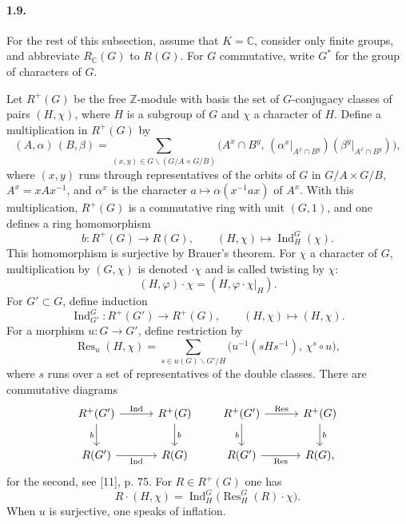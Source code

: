\documentclass[10pt]{article}
\newcommand{\C}{\mathbb C}
\newcommand{\Z}{\mathbb Z}
\newcommand{\Ind}{\operatorname{Ind}}
\newcommand{\Res}{\operatorname{Res}}
\providecommand{\Ind}{\operatorname{Ind}}
\begin{document}
\paragraph{1.9.} For the rest of this subsection, assume that \(K=\C\), consider only finite groups, and abbreviate \(R_\C(G)\) to \(R(G)\). For \(G\) commutative, write \(G^*\) for the group of characters of \(G\).

Let \(R^+(G)\) be the free \(\Z\)-module with basis the set of \(G\)-conjugacy classes of pairs \((H,\chi)\), where \(H\) is a subgroup of \(G\) and \(\chi\) a character of \(H\). Define a multiplication in \(R^+(G)\) by
\[
\tag{1.9.1}
(A,\alpha)\,(B,\beta)=
\sum_{(x,y)\in G\backslash(G/A\times G/B)}
\bigl(A^x\cap B^y,\,
(\alpha^x|_{A^x\cap B^y})(\beta^y|_{A^x\cap B^y})\bigr),
\]
where \((x,y)\) runs through representatives of the orbits of \(G\) in \(G/A\times G/B\), \(A^x=xAx^{-1}\), and \(\alpha^x\) is the character \(a\mapsto \alpha(x^{-1}ax)\) of \(A^x\). With this multiplication, \(R^+(G)\) is a commutative ring with unit \((G,1)\), and one defines a ring homomorphism
\[
\tag{1.9.2}
b:R^+(G)\longrightarrow R(G),\qquad (H,\chi)\longmapsto \Ind_H^G(\chi).
\]
This homomorphism is surjective by Brauer's theorem. For \(\chi\) a character of \(G\), multiplication by \((G,\chi)\) is denoted \(\cdot\chi\) and is called twisting by \(\chi\):
\[
\tag{1.9.3}
(H,\varphi)\cdot\chi=(H,\varphi\cdot\chi|_H).
\]
For \(G'\subset G\), define induction
\[
\tag{1.9.4}
\Ind_{G'}^G:R^+(G')\longrightarrow R^+(G),\qquad (H,\chi)\longmapsto(H,\chi).
\]
For a morphism \(u:G\to G'\), define restriction by
\[
\tag{1.9.5}
\Res_u(H,\chi)=
\sum_{s\in u(G)\backslash G'/H}
\bigl(u^{-1}(sHs^{-1}),\,\chi^s\circ u\bigr),
\]
where \(s\) runs over a set of representatives of the double classes. There are commutative diagrams
\[
\begin{tikzcd}[column sep=3.0em,row sep=2.0em]
R^+(G') \arrow[r,"\Ind"] \arrow[d,"b"'] & R^+(G) \arrow[d,"b"]\\
R(G') \arrow[r,"\Ind"'] & R(G)
\end{tikzcd}
\qquad
\begin{tikzcd}[column sep=3.0em,row sep=2.0em]
R^+(G') \arrow[r,"\Res"] \arrow[d,"b"'] & R^+(G) \arrow[d,"b"]\\
R(G') \arrow[r,"\Res"'] & R(G),
\end{tikzcd}
\]
for the second, see [11], p. 75. For \(R\in R^+(G)\) one has
\[
\tag{1.9.6}
R\cdot(H,\chi)=\Ind_H^G\bigl(\Res_H^G(R)\cdot\chi\bigr).
\]
When \(u\) is surjective, one speaks of inflation.
\end{document}
